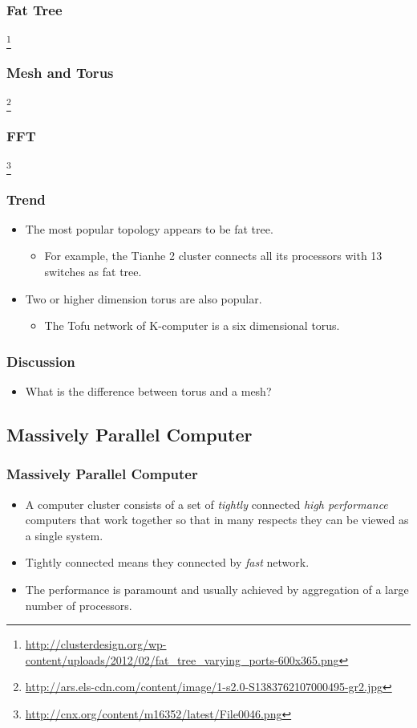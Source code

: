 \documentclass{beamer}
\begin{document}
\begin{CJK}{UTF8}{bsmi}
\begin{frame}
\frametitle{Fat Tree}
\centerline{}
\footnote{\url{http://clusterdesign.org/wp-content/uploads/2012/02/fat_tree_varying_ports-600x365.png}}
\end{frame}

\begin{frame}
\frametitle{Mesh and Torus}
\centerline{}
\footnote{\url{http://ars.els-cdn.com/content/image/1-s2.0-S1383762107000495-gr2.jpg}}
\end{frame}

\begin{frame}
\frametitle{FFT}
\centerline{}
\footnote{\url{http://cnx.org/content/m16352/latest/File0046.png}}
\end{frame}

\begin{frame}
\frametitle{Trend}
\begin{itemize}
\item The most popular topology appears to be fat tree.
\begin{itemize}
\item For example, the Tianhe 2 cluster connects all its processors
  with 13 switches as fat tree.
\end{itemize}
\item Two or higher dimension torus are also popular.
\begin{itemize}
\item The Tofu network of K-computer is a six dimensional torus.
\end{itemize}
\end{itemize}
\end{frame}

\begin{frame}
\frametitle{Discussion}
\begin{itemize}
\item What is the difference between torus and a mesh?
\end{itemize}
\end{frame}

\subsection{Massively Parallel Computer}

\begin{frame}
\frametitle{Massively Parallel Computer}
\begin{itemize}
\item A computer cluster consists of a set of {\em tightly} connected
  {\em high performance} computers that work together so that in many
  respects they can be viewed as a single system.
\item Tightly connected means they connected by {\em fast}
  network.
\item The performance is paramount and usually achieved by
  aggregation of a large number of processors.
\end{itemize}
\end{frame}


\end{CJK}
\end{document}

